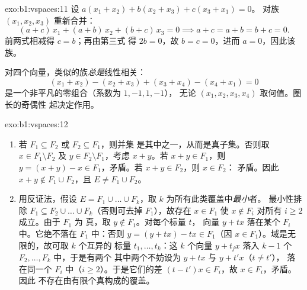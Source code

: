 \begin{solution}{exo:b1:vspaces:11}
设 $a(x_1 + x_2) + b(x_2 + x_3) + c(x_3 + x_1) = 0$。
对族 $(x_1, x_2, x_3)$ 重新合并：
\[
(a + c)\,x_1 + (a + b)\,x_2 + (b + c)\,x_3 = 0
\implies a + c = a + b = b + c = 0 .
\]
前两式相减得 $c = b$；再由第三式
得 $2b = 0$，故 $b = c = 0$，进而 $a = 0$，因此该族。

对四个向量，类似的族\emph{总是}线性相关：
\[
(x_1 + x_2) - (x_2 + x_3) + (x_3 + x_4) - (x_4 + x_1) = 0
\]
是一个非平凡的零组合（系数为 $1, -1, 1, -1$），
无论 $(x_1, x_2, x_3, x_4)$ 取何值。圈长的奇偶性
起决定作用。
\end{solution}

\begin{solution}{exo:b1:vspaces:12}
\begin{enumerate}
  \item 若 $F_1 \subseteq F_2$ 或 $F_2 \subseteq F_1$，则并集
        是其中之一，从而是真子集。否则取 $x \in F_1
        \setminus F_2$ 及 $y \in F_2 \setminus F_1$，考虑
        $x + y$。若 $x + y \in F_1$，则 $y = (x + y) - x \in
        F_1$，矛盾。若 $x + y \in F_2$，则 $x \in F_2$：
        矛盾。因此 $x + y \notin F_1 \cup F_2$，且 $E \neq
        F_1 \cup F_2$。
  \item 用反证法，假设 $E = F_1 \cup \dots \cup
        F_k$，取 $k$ 为所有此类覆盖中\emph{最小}者。
        最小性排除 $F_1 \subseteq F_2 \cup
        \dots \cup F_k$（否则可去掉 $F_1$），故存在 $x \in F_1$
        使 $x \notin F_i$ 对所有 $i \geq 2$ 成立。由于 $F_1$ 为
        真，取 $y \notin F_1$。对每个标量 $t$，
        向量 $y + t x$ 落在某个 $F_i$ 中。它绝不落在
        $F_1$ 中：否则 $y = (y + tx) - tx \in F_1$（因 $x \in
        F_1$）。域是无限的，故可取 $k$ 个互异的
        标量 $t_1, \dots, t_k$：这 $k$ 个向量 $y + t_j x$
        落入 $k - 1$ 个 $F_2, \dots, F_k$ 中，于是有两个
        其中两个不妨设为 $y + t x$ 与 $y + t' x$（$t \neq t'$），
        落在同一个 $F_i$ 中（$i \geq 2$）。于是它们的差
        $(t - t')x \in F_i$，故 $x \in F_i$，矛盾。因此
        不存在由有限个真构成的覆盖。
\end{enumerate}
\end{solution}

